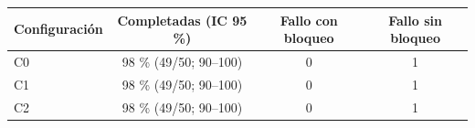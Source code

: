 \begin{tabular}{lccc}
\toprule
Configuración & Completadas (IC 95 \%) & Fallo con bloqueo & Fallo sin bloqueo \\
\midrule
C0 & 98 \% (49/50; 90--100) & 0 & 1 \\
C1 & 98 \% (49/50; 90--100) & 0 & 1 \\
C2 & 98 \% (49/50; 90--100) & 0 & 1 \\
\bottomrule
\end{tabular}

